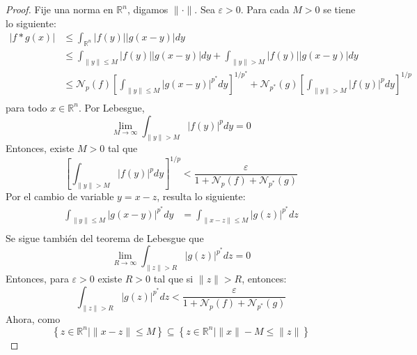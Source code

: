 \documentclass[12pt]{report}
\theoremstyle{largebreak}
\newcommand\abs[1]{\ensuremath{\big|#1\big|}}
\newcommand\norm[1]{\ensuremath{\|#1\|}}
\newcommand{\N}[2]{\ensuremath{\mathcal{N}_{#1}\left(#2\right)}}
\begin{document}
    \begin{proof}
        Fije una norma en $\mathbb{R}^n$, digamos $\norm{\cdot}$. Sea $\varepsilon>0$. Para cada $M>0$ se tiene lo siguiente:
        \begin{equation*}
            \begin{split}
                \abs{f*g(x)}&\leq\int_{\mathbb{R}^n}\abs{f(y)}\abs{g(x-y)}dy\\
                &\leq\int_{ \norm{y}\leq M}\abs{f(y)}\abs{g(x-y)}dy+\int_{ \norm{y}> M}\abs{f(y)}\abs{g(x-y)}dy\\
                &\leq\N{p}{f}\left[\int_{ \norm{y}\leq M}\abs{g(x-y)}^{ p^*}dy\right]^{ 1/p^*}+\N{p^*}{g}\left[\int_{ \norm{y}>M}\abs{f(y)}^pdy \right]^{1/p}\\
            \end{split}
        \end{equation*}
        para todo $x\in\mathbb{R}^n$. Por Lebesgue,
        \begin{equation*}
            \lim_{ M\rightarrow\infty}\int_{\norm{y}>M}\abs{f(y)}^pdy=0
        \end{equation*}
        Entonces, existe $M>0$ tal que
        \begin{equation*}
            \left[\int_{ \norm{y}>M}\abs{f(y)}^pdy \right]^{1/p}<\frac{\varepsilon}{1+\N{p}{f}+\N{p^*}{g}}
        \end{equation*}
        Por el cambio de variable $y=x-z$, resulta lo siguiente:
        \begin{equation*}
            \begin{split}
                \int_{\norm{y}\leq M }\abs{g(x-y)}^{ p^*}dy&=\int_{\norm{x-z}\leq M }\abs{g(z)}^{ p^*}dz\\
            \end{split}
        \end{equation*}
        Se sigue también del teorema de Lebesgue que
        \begin{equation*}
            \lim_{ R\rightarrow\infty}\int_{ \norm{z}>R}\abs{g(z)}^{p^*}dz=0
        \end{equation*}
        Entonces, para $\varepsilon>0$ existe $R>0$ tal que si $\norm{z}>R$, entonces:
        \begin{equation*}
            \int_{ \norm{z}>R}\abs{g(z)}^{p^*}dz<\frac{\varepsilon}{1+\N{p}{f}+\N{p^*}{g}}
        \end{equation*}
        Ahora, como 
        \begin{equation*}
            \left\{z\in\mathbb{R}^n\Big|\norm{x-z}\leq M \right\}\subseteq \left\{z\in\mathbb{R}^n\Big|\norm{x}-M\leq\norm{z} \right\}

\end{equation*}
\end{proof}
\end{document}

